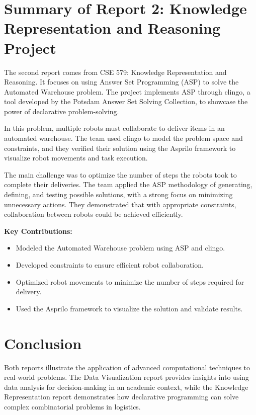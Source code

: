 \documentclass{IEEEtran}
\begin{document}
\section{Summary of Report 2: Knowledge Representation and Reasoning Project}
The second report comes from CSE 579: Knowledge Representation and Reasoning. It focuses on using Answer Set Programming (ASP) to solve the Automated Warehouse problem. The project implements ASP through clingo, a tool developed by the Potsdam Answer Set Solving Collection, to showcase the power of declarative problem-solving.

In this problem, multiple robots must collaborate to deliver items in an automated warehouse. The team used clingo to model the problem space and constraints, and they verified their solution using the Asprilo framework to visualize robot movements and task execution.

The main challenge was to optimize the number of steps the robots took to complete their deliveries. The team applied the ASP methodology of generating, defining, and testing possible solutions, with a strong focus on minimizing unnecessary actions. They demonstrated that with appropriate constraints, collaboration between robots could be achieved efficiently.

\textbf{Key Contributions:}
\begin{itemize}
    \item Modeled the Automated Warehouse problem using ASP and clingo.
    \item Developed constraints to ensure efficient robot collaboration.
    \item Optimized robot movements to minimize the number of steps required for delivery.
    \item Used the Asprilo framework to visualize the solution and validate results.
\end{itemize}

\section{Conclusion}
Both reports illustrate the application of advanced computational techniques to real-world problems. The Data Visualization report provides insights into using data analysis for decision-making in an academic context, while the Knowledge Representation report demonstrates how declarative programming can solve complex combinatorial problems in logistics.
\end{document}
